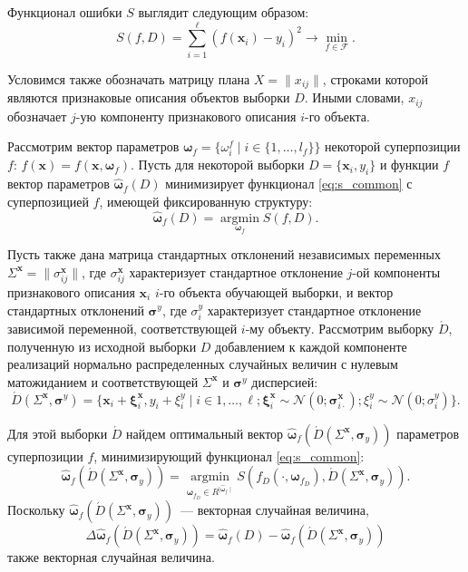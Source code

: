 \documentclass[12pt,a4paper]{article}
\begin{document}
Функционал ошибки $S$ выглядит следующим образом: 
\begin{equation}
  S(f, D) = \sum_{i = 1}^\ell (f(\mathbf{x}_i) - y_i)^2 \rightarrow \min_{f \in \mathcal{F}}.
  \label{eq:s_common}
\end{equation}

Условимся также обозначать матрицу плана $X = \| x_{ij} \|$, строками которой
являются признаковые описания объектов выборки $D$. Иными словами, $x_{ij}$
обозначает $j$-ую компоненту признакового описания $i$-го объекта.

Рассмотрим вектор параметров
$\boldsymbol{\omega}_f = \{ \omega_i^f \mid i \in \{ 1, \dots, l_f \} \}$
некоторой суперпозиции $f$: $f(\mathbf{x}) = f(\mathbf{x}, \boldsymbol{\omega}_f)$.
Пусть для некоторой выборки $D = \{ \mathbf{x}_i, y_i \}$ и функции
$f$ вектор параметров $\hat{\boldsymbol{\omega}}_f(D)$ минимизирует
функционал \eqref{eq:s_common} с суперпозицией $f$, имеющей фиксированную
структуру:
\[
  \hat{\boldsymbol{\omega}}_f(D) = \mathop{\arg \min}\limits_{\boldsymbol{\omega}_f} S(f, D).
\]

Пусть также дана матрица стандартных отклонений
независимых переменных $\Sigma^{\mathbf{x}} = \| \sigma^{\mathbf{x}}_{ij} \|$,
где $\sigma^{\mathbf{x}}_{ij}$ характеризует стандартное отклонение $j$-ой
компоненты признакового описания $\mathbf{x}_i$ $i$-го объекта обучающей выборки,
и вектор стандартных отклонений $\boldsymbol{\sigma}^y$, где $\sigma^y_i$
характеризует стандартное отклонение зависимой переменной, соответствующей
$i$-му объекту.
Рассмотрим выборку $\acute{D}$, полученную из исходной выборки $D$
добавлением к каждой компоненте реализаций нормально распределенных
случайных величин с нулевым матожиданием и соответствующей
$\Sigma^{\mathbf{x}}$ и $\boldsymbol{\sigma}^y$ дисперсией:
\begin{equation}
  \acute{D}(\Sigma^{\mathbf{x}}, \boldsymbol{\sigma}^y) = \{ \mathbf{x}_i + \boldsymbol{\xi}^{\mathbf{x}}_i, y_i + \xi^y_i \mid i \in 1, \dots, \ell; \boldsymbol{\xi}^{\mathbf{x}}_i \sim \mathcal{N}(0; \boldsymbol{\sigma}^{\mathbf{x}}_{i \cdot}); \xi^y_i \sim \mathcal{N}(0; \sigma^y_i) \}.
  \label{eq:d_acute}
\end{equation}

Для этой выборки $\acute{D}$ найдем оптимальный вектор $\hat{\boldsymbol{\omega}}_f (\acute{D} (\Sigma^{\mathbf{x}}, \boldsymbol{\sigma}_y))$
параметров суперпозиции $f$, минимизирующий функционал \eqref{eq:s_common}:
\begin{equation}
  \hat{\boldsymbol{\omega}}_f (\acute{D} (\Sigma^{\mathbf{x}}, \boldsymbol{\sigma}_y)) = \mathop{\arg \min}\limits_{\boldsymbol{\omega}_{f_D} \in R^{\mid \hat{\boldsymbol{\omega}}_f \mid}} S (f_D (\cdot, \boldsymbol{\omega}_{f_D}), \acute{D} (\Sigma^{\mathbf{x}}, \boldsymbol{\sigma}_y)).
  \label{eq:hat_omega}
\end{equation}
Поскольку $\hat{\boldsymbol{\omega}}_f (\acute{D} (\Sigma^{\mathbf{x}}, \boldsymbol{\sigma}_y))$~---
векторная случайная величина,
\[
  \Delta\hat{\boldsymbol{\omega}}_f(\acute{D} (\Sigma^{\mathbf{x}}, \boldsymbol{\sigma}_y) ) = \hat{\boldsymbol{\omega}}_f(D) - \hat{\boldsymbol{\omega}}_f (\acute{D} (\Sigma^{\mathbf{x}}, \boldsymbol{\sigma}_y))
\]
также векторная случайная величина.
\end{document}

